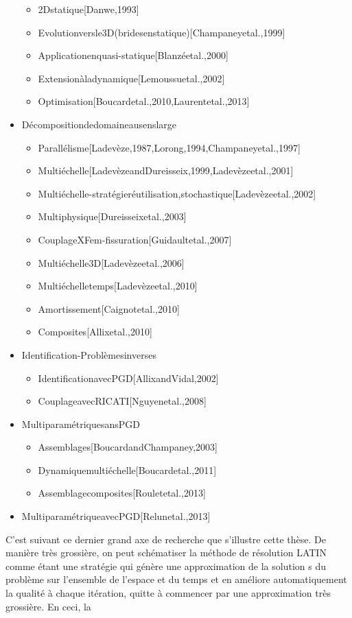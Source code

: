 \documentclass[12pt,a4paper]{report}
\begin{document}
\begin{itemize}
		\begin{itemize}
		 \item 2Dstatique[Danwe,1993]
		 \item Evolutionversle3D(bridesenstatique)[Champaneyetal.,1999]  \item Applicationenquasi-statique[Blanzéetal.,2000]
		 \item Extensionàladynamique[Lemoussuetal.,2002]
		 \item Optimisation[Boucardetal.,2010,Laurentetal.,2013]
 		\end{itemize}
 	\item Décompositiondedomaineausenslarge
		\begin{itemize}
		 \item Parallélisme[Ladevèze,1987,Lorong,1994,Champaneyetal.,1997]
		 \item Multiéchelle[LadevèzeandDureisseix,1999,Ladevèzeetal.,2001]
		 \item Multiéchelle-stratégieréutilisation,stochastique[Ladevèzeetal.,2002]  \item Multiphysique[Dureisseixetal.,2003]
		 \item CouplageXFem-fissuration[Guidaultetal.,2007]
		 \item Multiéchelle3D[Ladevèzeetal.,2006]
		 \item Multiéchelletemps[Ladevèzeetal.,2010]
		 \item Amortissement[Caignotetal.,2010]
		 \item Composites[Allixetal.,2010]
 		\end{itemize}
 	\item Identification-Problèmesinverses
		\begin{itemize}
		 \item IdentificationavecPGD[AllixandVidal,2002]
		 \item CouplageavecRICATI[Nguyenetal.,2008]
 		\end{itemize}
 	\item MultiparamétriquesansPGD
		\begin{itemize}
		 \item Assemblages[BoucardandChampaney,2003]
		 \item Dynamiquemultiéchelle[Boucardetal.,2011]
		 \item Assemblagecomposites[Rouletetal.,2013]
 		\end{itemize}
 	\item MultiparamétriqueavecPGD[Relunetal.,2013]
  \end{itemize}
C'est suivant ce dernier grand axe de recherche que s'illustre cette thèse.
De manière très grossière, on peut schématiser la méthode de résolution LATIN comme étant une stratégie qui génère une approximation de la solution s du problème sur l'ensemble de l'espace et du temps et en améliore automatiquement la qualité à chaque itération, quitte à commencer par une approximation très grossière. En ceci, la
\end{document}
